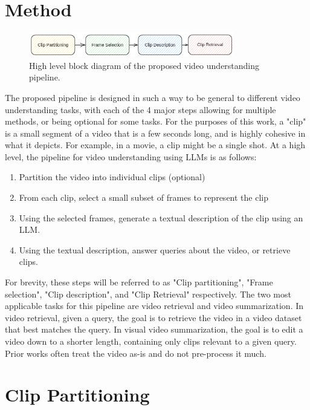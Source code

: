 \section{Method}


\begin{figure}
      \centering
      \includegraphics[width=0.8\textwidth]{figures/pipeline.png}
      \caption{High level block diagram of the proposed video understanding pipeline.}
      \label{fig:pipeline}
\end{figure}

The proposed pipeline is designed in such a way to be general to different video understanding tasks, with each of the 4 major steps allowing for multiple methods, or being optional for some tasks.
For the purposes of this work, a "clip" is a small segment of a video that is a few seconds long, 
and is highly cohesive in what it depicts. For example, in a movie, a clip might be a single shot.
At a high level, the pipeline for video understanding using LLMs is as follows:
\begin{enumerate}
      \item Partition the video into individual clips (optional)
      \item From each clip, select a small subset of frames to represent the clip
      \item Using the selected frames, generate a textual description of the clip using an LLM.
      \item Using the textual description, answer queries about the video, or retrieve clips.
\end{enumerate}

For brevity, these steps will be referred to as "Clip partitioning", "Frame selection", "Clip description", and "Clip Retrieval" respectively.
The two most applicable tasks for this pipeline are video retrieval and video summarization.
In video retrieval, given a query, the goal is to retrieve the video in a video dataset that best matches the query.
In visual video summarization, the goal is to edit a video down to a shorter length, containing only clips relevant to a given query.
Prior works often treat the video as-is and do not pre-process it much.



\section{Clip Partitioning}

